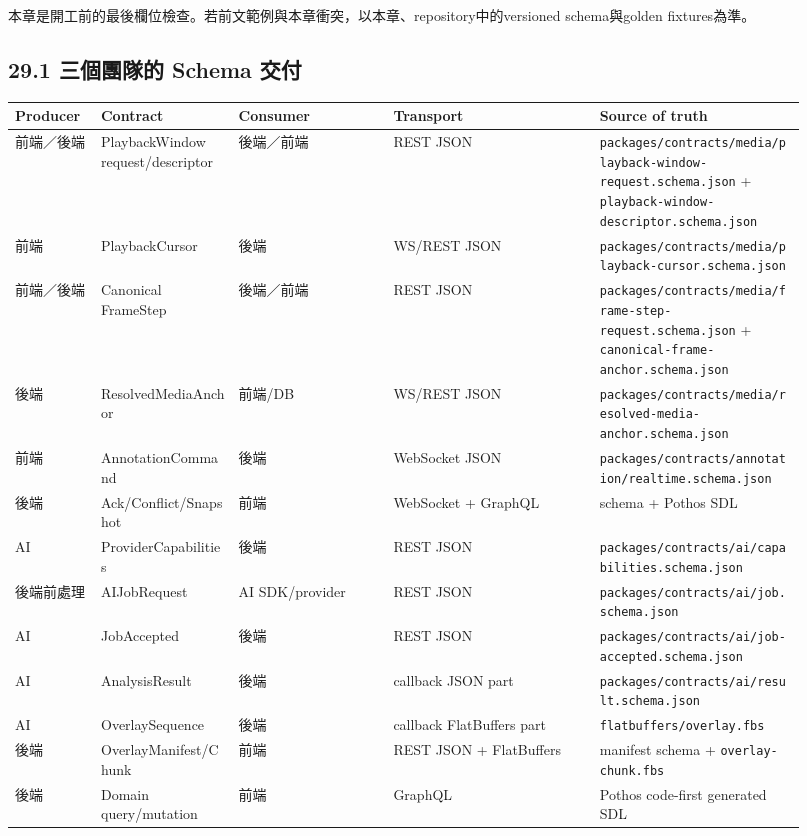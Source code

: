 \documentclass[
  9pt,
  a4paper,
]{article}
\begin{document}
本章是開工前的最後欄位檢查。若前文範例與本章衝突，以本章、repository中的versioned
schema與golden fixtures為準。

\subsection{29.1 三個團隊的 Schema
交付}\label{291-ux4e09ux500bux5718ux968aux7684-schema-ux4ea4ux4ed8}

\begin{longtable}[]{@{}>{\RaggedRight\arraybackslash}p{0.10\linewidth}>{\RaggedRight\arraybackslash}p{0.16\linewidth}>{\RaggedRight\arraybackslash}p{0.18\linewidth}>{\RaggedRight\arraybackslash}p{0.24\linewidth}>{\RaggedRight\arraybackslash}p{0.24\linewidth}@{}}
\toprule\noalign{}
Producer & Contract & Consumer & Transport & Source of truth \\
\midrule\noalign{}
\endhead
\bottomrule\noalign{}
\endlastfoot
前端／後端 & PlaybackWindow request/descriptor & 後端／前端 & REST JSON
& \texttt{packages/contracts/media/playback-window-request.schema.json}
+ \texttt{playback-window-descriptor.schema.json} \\
前端 & PlaybackCursor & 後端 & WS/REST JSON &
\texttt{packages/contracts/media/playback-cursor.schema.json} \\
前端／後端 & Canonical FrameStep & 後端／前端 & REST JSON &
\texttt{packages/contracts/media/frame-step-request.schema.json} +
\texttt{canonical-frame-anchor.schema.json} \\
後端 & ResolvedMediaAnchor & 前端/DB & WS/REST JSON &
\texttt{packages/contracts/media/resolved-media-anchor.schema.json} \\
前端 & AnnotationCommand & 後端 & WebSocket JSON &
\texttt{packages/contracts/annotation/realtime.schema.json} \\
後端 & Ack/Conflict/Snapshot & 前端 & WebSocket + GraphQL & schema +
Pothos SDL \\
AI & ProviderCapabilities & 後端 & REST JSON &
\texttt{packages/contracts/ai/capabilities.schema.json} \\
後端前處理 & AIJobRequest & AI SDK/provider & REST JSON &
\texttt{packages/contracts/ai/job.schema.json} \\
AI & JobAccepted & 後端 & REST JSON &
\texttt{packages/contracts/ai/job-accepted.schema.json} \\
AI & AnalysisResult & 後端 & callback JSON part &
\texttt{packages/contracts/ai/result.schema.json} \\
AI & OverlaySequence & 後端 & callback FlatBuffers part &
\texttt{flatbuffers/overlay.fbs} \\
後端 & OverlayManifest/Chunk & 前端 & REST JSON + FlatBuffers & manifest
schema + \texttt{overlay-chunk.fbs} \\
後端 & Domain query/mutation & 前端 & GraphQL & Pothos code-first
generated SDL \\
\end{longtable}
\end{document}
